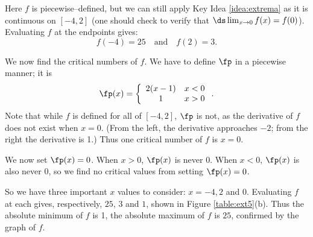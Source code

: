 {Here $f$ is piecewise--defined, but we can still apply Key Idea \ref{idea:extrema} as it is continuous on $[-4,2]$ (one should check to verify that $\ds\lim_{x\to0}f(x) =f(0)$). Evaluating $f$ at the endpoints gives: 
$$ f(-4) = 25 \quad \text{and} \quad f(2) = 3.$$

We now find the critical numbers of $f$. We have to define $\fp$ in a piecewise manner; it is $$\fp(x) =\left\{\begin{array}{cc} 2(x-1) & x < 0 \\ 1 & x>0 \end{array}\right. .$$ Note that while $f$ is defined for all of $[-4,2]$, $\fp$ is not, as the derivative of $f$ does not exist when $x=0$. (From the left, the derivative approaches $-2$; from the right the derivative is 1.) Thus one critical number of $f$ is $x=0$.

We now set $\fp(x) = 0$. When $x >0$, $\fp(x)$ is never 0.  When $x<0$, $\fp(x)$ is also never 0, so we find no critical values from setting $\fp(x)=0$. %

So we have three important $x$ values to consider: $x= -4, 2$ and $0$. Evaluating $f$ at each gives, respectively, $25$, $3$ and $1$, shown in Figure \ref{table:ext5}(b). Thus the absolute minimum of $f$ is 1, the absolute maximum of $f$ is $25$, confirmed by the graph of $f$.
}\\

